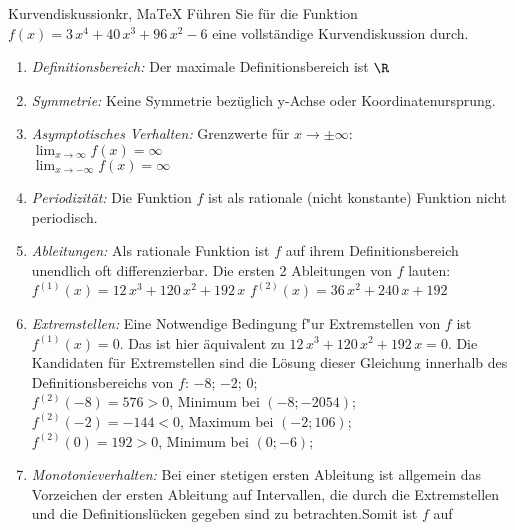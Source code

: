 \providecommand{\MoIl}{(} 
 \providecommand{\MoIr}{)}
 \providecommand{\MIntvlSep}{;} 
 \providecommand{\MElSetSep}{;} 
 \begin{MAufgabe}{Kurvendiskussion}{kr, MaTeX}
 F\"uhren Sie f\"ur die Funktion $f(x)=3\, x^4 + 40\, x^3 + 96\, x^2 - 6$ eine vollst\"andige Kurvendiskussion durch.\\ 
 \ifLsg\Loesung
 \begin{enumerate}
 \item \emph{Definitionsbereich:} 
 Der maximale Definitionsbereich ist $\R$\item \emph{Symmetrie:} 
 Keine Symmetrie bez\"uglich y-Achse oder Koordinatenursprung.\item \emph{Asymptotisches Verhalten:} 
 Grenzwerte f\"ur $x\rightarrow \pm \infty$: \\ 
 $\lim_{x\rightarrow \infty} f(x)=\infty$ \\ 
 $\lim_{x\rightarrow -\infty} f(x)=\infty$ \\ 
 \item \emph{Periodizit\"at:} 
 Die Funktion $f$ ist als rationale (nicht konstante) Funktion nicht periodisch.\item \emph{Ableitungen:} 
 Als rationale Funktion ist $f$ auf ihrem Definitionsbereich unendlich oft differenzierbar. 
 Die ersten 2 Ableitungen von $f$ lauten: \\ 
 $f^{(1)}(x)=12\, x^3 + 120\, x^2 + 192\, x$\newline 
  $f^{(2)}(x)=36\, x^2 + 240\, x + 192$\newline 
  \item \emph{Extremstellen:} 
 Eine Notwendige Bedingung f"ur Extremstellen von $f$ ist $f^{(1)}(x)=0$. 
 Das ist hier \"aquivalent zu $12\, x^3 + 120\, x^2 + 192\, x=0$. 
 Die Kandidaten f\"ur Extremstellen sind die L\"osung dieser Gleichung innerhalb des Definitionsbereichs von $f$: $-8$; $-2$; $0$; \\ 
 $f^{(2)}(-8)=576$$>0$, Minimum bei $(-8;-2054)$; \\ 
 $f^{(2)}(-2)=-144$$<0$, Maximum bei $(-2;106)$; \\ 
 $f^{(2)}(0)=192$$>0$, Minimum bei $(0;-6)$; \\ 
 \item \emph{Monotonieverhalten:} 
 Bei einer stetigen ersten Ableitung ist allgemein das Vorzeichen der ersten Ableitung auf Intervallen, die durch die Extremstellen und die Definitionsl\"ucken gegeben sind zu betrachten.Somit ist $f$ auf \\ 
$$
\end{enumerate}
\end{MAufgabe}
